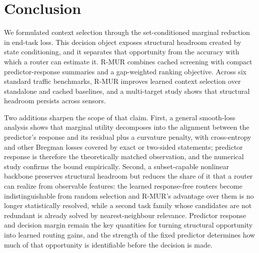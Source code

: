 \section{Conclusion}

We formulated context selection through the set-conditioned marginal reduction
in end-task loss. This decision object exposes structural headroom created by
state conditioning, and it separates that opportunity from the accuracy with
which a router can estimate it. R-MUR combines cached screening with compact
predictor-response summaries and a gap-weighted ranking objective. Across six
standard traffic benchmarks, R-MUR improves learned context selection over
standalone and cached baselines, and a multi-target study shows that structural
headroom persists across sensors.

Two additions sharpen the scope of that claim. First, a general smooth-loss
analysis shows that marginal utility decomposes into the alignment between the
predictor's response and its residual plus a curvature penalty, with
cross-entropy and other Bregman losses covered by exact or two-sided
statements; predictor response is therefore the theoretically matched
observation, and the numerical study confirms the bound empirically. Second, a
subset-capable nonlinear backbone preserves structural headroom but reduces the
share of it that a router can realize from observable features: the learned
response-free routers become indistinguishable from random selection and
R-MUR's advantage over them is no longer statistically resolved, while a second
task family whose candidates are not redundant is already solved by
nearest-neighbour relevance. Predictor response and decision margin remain the
key quantities for turning structural opportunity into learned routing gains,
and the strength of the fixed predictor determines how much of that opportunity
is identifiable before the decision is made.
